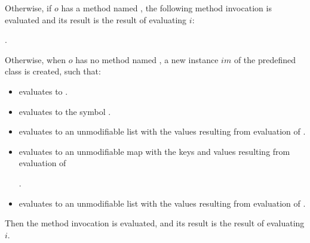 \documentclass{article}
\begin{document}
\noindent
Otherwise, if $o$ has a method named \CALL{},
the following method invocation is evaluated and its result is the result of evaluating $i$:

.

\noindent
Otherwise, when $o$ has no method named \CALL{},
a new instance $im$ of the predefined class  is created, such that:
\begin{itemize}
\item {} evaluates to \code{\TRUE{}}.
\item {} evaluates to the symbol .
\item {} evaluates to an unmodifiable list with the values
resulting from evaluation of
.
\item {} evaluates to an unmodifiable map
with the keys and values resulting from evaluation of

.
\item {} evaluates to an unmodifiable list
with the values resulting from evaluation of
.
\end{itemize}

\LMHash{}
Then the method invocation  is evaluated,
and its result is the result of evaluating $i$.
\end{document}
